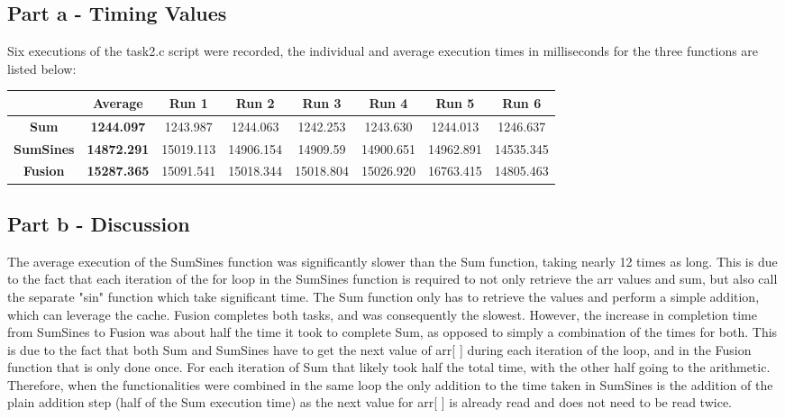 \documentclass[11pt, oneside]{article}   	%
\begin{document}
\subsection*{Part a - Timing Values}
Six executions of the task2.c script were recorded, the individual and average execution times in milliseconds for the three functions are listed below:
\newline
\begin{center}
\begin{tabular}{ |c|c|c|c|c|c|c|c| }
	\hline
	 & \textbf{Average} & Run 1 & Run 2 & Run 3 & Run 4 & Run 5 & Run 6\\
	\hline
	\textbf{Sum} & \textbf{1244.097} & 1243.987 & 1244.063 & 1242.253 & 1243.630 & 1244.013 & 1246.637 \\
	\hline
	\textbf{SumSines} & \textbf{14872.291}  & 15019.113 & 14906.154 & 14909.59 & 14900.651 & 14962.891 & 14535.345 \\
	\hline
	\textbf{Fusion} & \textbf{15287.365} & 15091.541 & 15018.344 & 15018.804 & 15026.920 & 16763.415 & 14805.463 \\
	\hline
\end{tabular}
\end{center}
\subsection*{Part b - Discussion}
The average execution of the SumSines function was significantly slower than the Sum function, taking nearly 12 times as long. This is due to the fact that each iteration of the for loop in the SumSines function is required to not only retrieve the arr values and sum, but also call the separate "sin" function which take significant time.  The Sum function only has to retrieve the values and perform a simple addition, which can leverage the cache.  Fusion completes both tasks, and was consequently the slowest.
\newline
\newline
However, the increase in completion time from SumSines to Fusion was about half the time it took to complete Sum, as opposed to simply a combination of the times for both.  This is due to the fact that both Sum and SumSines have to get the next value of arr[ ] during each iteration of the loop, and in the Fusion function that is only done once.  For each iteration of Sum that likely took half the total time, with the other half going to the arithmetic.  Therefore, when the functionalities were combined in the same loop the only addition to the time taken in SumSines is the addition of the plain addition step (half of the Sum execution time) as the next value for arr[ ] is already read and does not need to be read twice.
\end{document}
